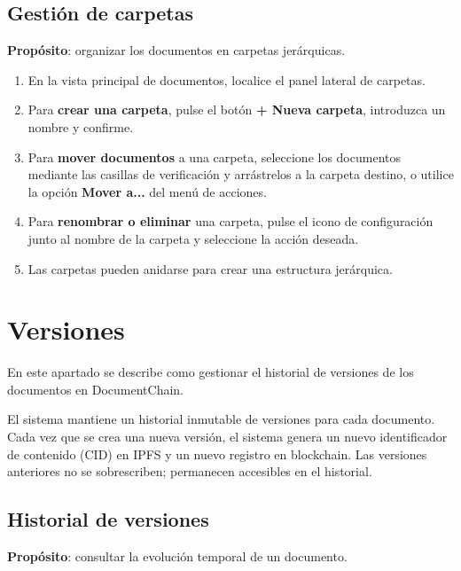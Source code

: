 \documentclass[11pt, a4paper]{article}
\begin{document}
\subsection{Gesti\'{o}n de carpetas}

\textbf{Prop\'{o}sito}: organizar los documentos en carpetas jer\'{a}rquicas.

\begin{enumerate}
    \item En la vista principal de documentos, localice el panel lateral de carpetas.
    \item Para \textbf{crear una carpeta}, pulse el bot\'{o}n \textbf{+ Nueva carpeta}, introduzca un nombre y confirme.
    \item Para \textbf{mover documentos} a una carpeta, seleccione los documentos mediante las casillas de verificaci\'{o}n y arr\'{a}strelos a la carpeta destino, o utilice la opci\'{o}n \textbf{Mover a...} del men\'{u} de acciones.
    \item Para \textbf{renombrar o eliminar} una carpeta, pulse el icono de configuraci\'{o}n junto al nombre de la carpeta y seleccione la acci\'{o}n deseada.
    \item Las carpetas pueden anidarse para crear una estructura jer\'{a}rquica.
\end{enumerate}

\section{Versiones}

En este apartado se describe como gestionar el historial de versiones de los documentos en DocumentChain.

El sistema mantiene un historial inmutable de versiones para cada documento. Cada vez que se crea una nueva versi\'{o}n, el sistema genera un nuevo identificador de contenido (CID) en IPFS y un nuevo registro en blockchain. Las versiones anteriores no se sobrescriben; permanecen accesibles en el historial.

\subsection{Historial de versiones}

\textbf{Prop\'{o}sito}: consultar la evoluci\'{o}n temporal de un documento.
\end{document}

